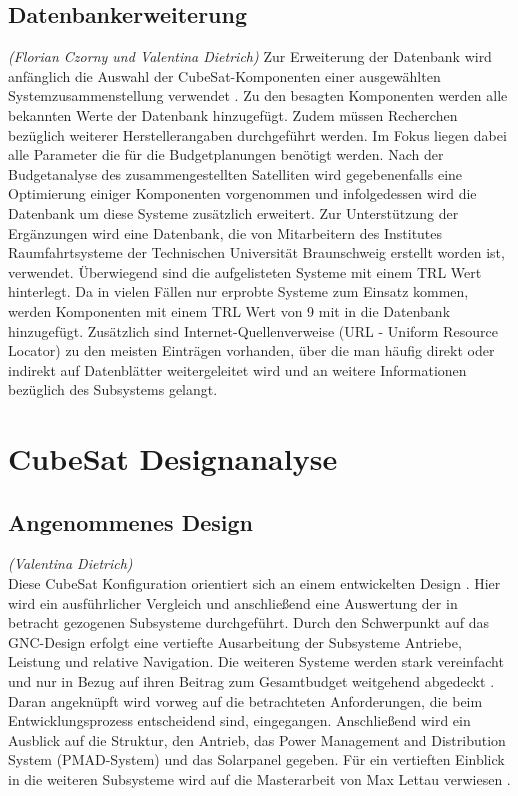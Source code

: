 			\subsection{Datenbankerweiterung}
			\hfill\emph{(Florian Czorny und Valentina Dietrich)}
			Zur Erweiterung der Datenbank wird anfänglich die Auswahl der CubeSat-Komponenten einer ausgewählten Systemzusammenstellung verwendet . Zu den besagten Komponenten werden alle bekannten Werte der Datenbank hinzugefügt. Zudem müssen Recherchen bezüglich weiterer Herstellerangaben durchgeführt werden. Im Fokus liegen dabei alle Parameter die für die Budgetplanungen benötigt werden. Nach der Budgetanalyse des zusammengestellten Satelliten wird gegebenenfalls eine Optimierung einiger Komponenten vorgenommen und infolgedessen wird die Datenbank um diese Systeme zusätzlich erweitert. Zur Unterstützung der Ergänzungen wird eine  Datenbank, die von Mitarbeitern des Institutes Raumfahrtsysteme der Technischen Universität Braunschweig erstellt worden ist, verwendet. Überwiegend sind die aufgelisteten Systeme mit einem TRL Wert hinterlegt. Da in vielen Fällen nur erprobte Systeme zum Einsatz kommen, werden Komponenten mit einem TRL Wert von 9 mit in die Datenbank hinzugefügt. Zusätzlich sind Internet-Quellenverweise (URL - Uniform Resource Locator) zu den meisten Einträgen vorhanden, über die man häufig direkt oder indirekt auf Datenblätter weitergeleitet wird und an weitere Informationen bezüglich des Subsystems gelangt.
		
		\section{CubeSat Designanalyse}
				
				\subsection{Angenommenes Design}
				\label{cap:AngenommenesDesign}
				\hfill\emph{(Valentina Dietrich)}\\
				Diese CubeSat Konfiguration orientiert sich an einem entwickelten Design \cite{Lettau.}. Hier wird ein ausführlicher Vergleich und anschließend eine Auswertung der in betracht gezogenen Subsysteme durchgeführt. Durch den Schwerpunkt auf das GNC-Design erfolgt eine vertiefte Ausarbeitung der Subsysteme Antriebe, Leistung und relative Navigation. Die weiteren Systeme werden stark vereinfacht und nur in Bezug auf ihren Beitrag zum Gesamtbudget weitgehend abgedeckt \cite{Lettau.}. Daran angeknüpft wird vorweg auf die betrachteten Anforderungen, die beim Entwicklungsprozess entscheidend sind, eingegangen. Anschließend wird ein Ausblick auf die Struktur, den Antrieb, das Power Management and Distribution System (PMAD-System) und das Solarpanel gegeben. Für ein vertieften Einblick in die weiteren Subsysteme wird auf die Masterarbeit von Max Lettau verwiesen \cite{Lettau.}.


